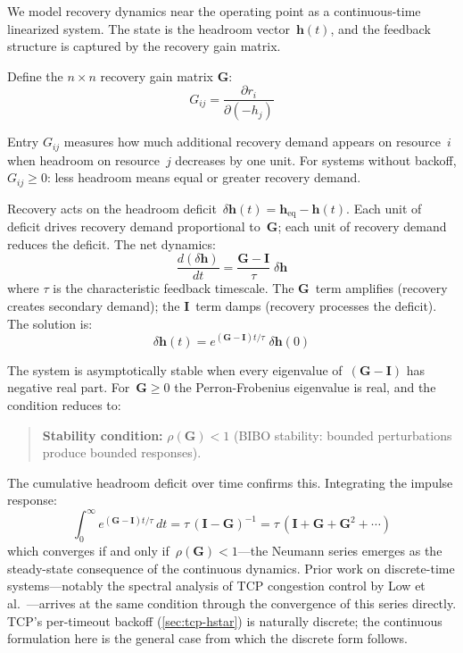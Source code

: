 \documentclass[11pt]{article}
\begin{document}
We model recovery dynamics near the operating point as a continuous-time
linearized system. The state is the headroom vector~$\mathbf{h}(t)$, and the
feedback structure is captured by the recovery gain matrix.

Define the $n \times n$ recovery gain matrix $\mathbf{G}$:
\begin{equation}
  G_{ij} = \frac{\partial r_i}{\partial (-h_j)}
\end{equation}

Entry $G_{ij}$ measures how much additional recovery demand appears on
resource~$i$ when headroom on resource~$j$ decreases by one unit. For systems
without backoff, $G_{ij} \geq 0$: less headroom means equal or greater recovery
demand.

Recovery acts on the headroom deficit~$\delta\mathbf{h}(t) = \mathbf{h}_{\mathrm{eq}} - \mathbf{h}(t)$.
Each unit of deficit drives recovery demand proportional to~$\mathbf{G}$; each
unit of recovery demand reduces the deficit. The net dynamics:
\begin{equation}
  \frac{d(\delta\mathbf{h})}{dt}
    = \frac{\mathbf{G} - \mathbf{I}}{\tau}\;\delta\mathbf{h}
  \label{eq:recovery-ode}
\end{equation}
where $\tau$ is the characteristic feedback timescale. The
$\mathbf{G}$~term amplifies (recovery creates secondary demand); the
$\mathbf{I}$~term damps (recovery processes the deficit). The solution is:
\begin{equation}
  \delta\mathbf{h}(t) = e^{(\mathbf{G} - \mathbf{I})t/\tau}\;\delta\mathbf{h}(0)
\end{equation}

The system is asymptotically stable when every eigenvalue
of~$(\mathbf{G} - \mathbf{I})$ has negative real part. For~$\mathbf{G} \geq 0$
the Perron-Frobenius eigenvalue is real, and the condition reduces to:

\begin{quote}
\textbf{Stability condition:} $\rho(\mathbf{G}) < 1$ (BIBO stability: bounded
perturbations produce bounded responses).
\end{quote}

The cumulative headroom deficit over time confirms this. Integrating the
impulse response:
\begin{equation}
  \int_0^\infty e^{(\mathbf{G} - \mathbf{I})t/\tau}\,dt
    = \tau\,(\mathbf{I} - \mathbf{G})^{-1}
    = \tau\,(\mathbf{I} + \mathbf{G} + \mathbf{G}^2 + \cdots)
\end{equation}
which converges if and only if~$\rho(\mathbf{G}) < 1$---the Neumann series
emerges as the steady-state consequence of the continuous dynamics. Prior work on
discrete-time systems---notably the spectral analysis of TCP congestion control
by Low et al.~\cite{low2002internet}---arrives at the same condition through
the convergence of this series directly. TCP's per-timeout backoff
(\cref{sec:tcp-hstar}) is naturally discrete; the continuous formulation here is
the general case from which the discrete form follows.
\end{document}
